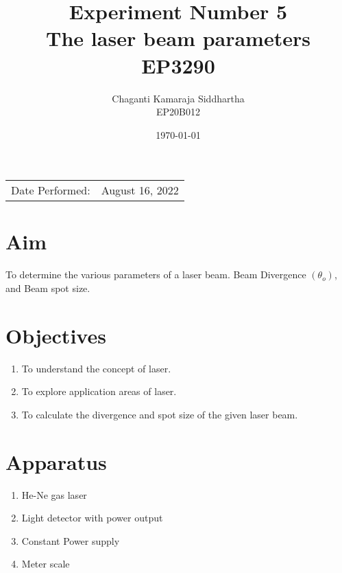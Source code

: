 \documentclass[
	letterpaper, %
	10pt, %
]{CSUniSchoolLabReport}
\title{Experiment Number 5\\The laser beam parameters\\ EP3290} %
\author{Chaganti Kamaraja Siddhartha\\EP20B012} %
\date{\today} %
\begin{document}
\maketitle %

\begin{center}
	\begin{tabular}{l r}
		Date Performed: & August 16, 2022 \\ %
	\end{tabular}
\end{center}


\section{Aim}
To determine the various parameters of a laser beam. Beam Divergence \((\theta_o)\), and Beam spot size.
\section{Objectives}
\begin{enumerate}
	\item To understand the concept of laser. 
	\item To explore application areas of laser. 
	\item To calculate the divergence and spot size of the given laser beam. 
\end{enumerate}
\section{Apparatus}
\begin{enumerate}
	\item He-Ne gas laser
	\item Light detector with power output
	\item Constant Power supply
	\item Meter scale
\end{enumerate}
\end{document}
